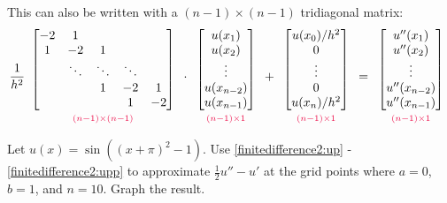 \noindent This can also be written with a $(n-1)\times(n-1)$ tridiagonal matrix:
\begin{align}
\frac{1}{h^2}
\begin{array}{c}
\begin{bmatrix}
-2 & 1 & \\
1 & -2 & 1  \\
& \ddots & \ddots & \ddots \\
& & 1 & -2 & 1 \\
& & & 1 & -2
\end{bmatrix}\\
{\scriptstyle\textcolor{red}{(n-1)\times(n-1)}}
\end{array}\cdot
\begin{array}{c}
\begin{bmatrix}
u(x_1) \\ u(x_2)\\ \vdots  \\ u(x_{n-2}) \\ u(x_{n-1})
\end{bmatrix}\\
{\scriptstyle\textcolor{red}{(n-1)\times1}}
\end{array} +
\begin{array}{c}
\begin{bmatrix}
u(x_0)/h^2 \\ 0 \\ \vdots  \\ 0 \\ u(x_n)/h^2
\end{bmatrix}\\
{\scriptstyle\textcolor{red}{(n-1)\times1}}
 \end{array} =
 \begin{array}{c}
\begin{bmatrix}
u''(x_1) \\ u''(x_2)\\ \vdots  \\ u''(x_{n-2}) \\ u''(x_{n-1})
\end{bmatrix}\\
{\scriptstyle\textcolor{red}{(n-1)\times1}}
\label{finitedifference2:upp}
\end{array}
\end{align}

\begin{problem}
	Let $u(x) = \sin((x+\pi)^2-1)$. Use \eqref{finitedifference2:up} - \eqref{finitedifference2:upp} to approximate $\frac{1}{2}u'' - u'$ at the grid points where $a=0$, $b=1$, and $n=10$. Graph the result.
\end{problem}

